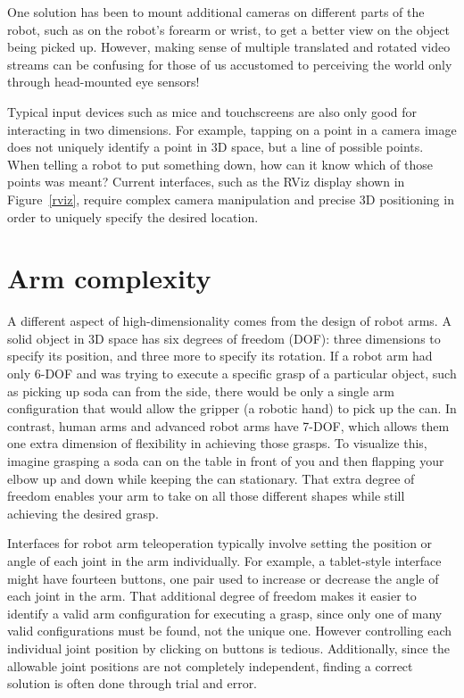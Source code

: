 \documentclass[11pt,twocolumn]{article}
\begin{document}
One solution has been to mount additional cameras on different parts of the robot, such as on the robot's forearm or wrist, to get a better view on the object being picked up. However, making sense of multiple translated and rotated video streams can be confusing for those of us accustomed to perceiving the world only through head-mounted eye sensors!

Typical input devices such as mice and touchscreens are also only good for interacting in two dimensions. For example, tapping on a point in a camera image does not uniquely identify a point in 3D space, but a line of possible points. When telling a robot to put something down, how can it know which of those points was meant? Current interfaces, such as the RViz display shown in Figure~\ref{rviz}, require complex camera manipulation and precise 3D positioning in order to uniquely specify the desired location.

\section{Arm complexity}

A different aspect of high-dimensionality comes from the design of robot arms. A solid object in 3D space has six degrees of freedom (DOF): three dimensions to specify its position, and three more to specify its rotation. If a robot arm had only 6-DOF and was trying to execute a specific grasp of a particular object, such as picking up soda can from the side, there would be only a single arm configuration that would allow the gripper (a robotic hand) to pick up the can. In contrast, human arms and advanced robot arms have 7-DOF, which allows them one extra dimension of flexibility in achieving those grasps. To visualize this, imagine grasping a soda can on the table in front of you and then flapping your elbow up and down while keeping the can stationary. That extra degree of freedom enables your arm to take on all those different shapes while still achieving the desired grasp.

Interfaces for robot arm teleoperation typically involve setting the position or angle of each joint in the arm individually. For example, a tablet-style interface might have fourteen buttons, one pair used to increase or decrease the angle of each joint in the arm. That additional degree of freedom makes it easier to identify a valid arm configuration for executing a grasp, since only one of many valid configurations must be found, not the unique one.  However controlling each individual joint position by clicking on buttons is tedious. Additionally, since the allowable joint positions are not completely independent, finding a correct solution is often done through trial and error.
\end{document}
